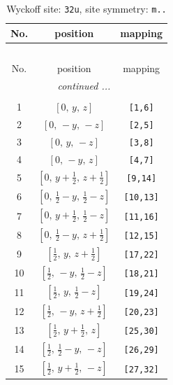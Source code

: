 \documentclass[fleqn,8pt]{jsarticle}
\begin{document}
\renewcommand{\arraystretch}{1.2}
\begin{longtable}{ccc}
\caption{Wyckoff site: {\tt 32u}, site symmetry: {\tt m..}}
 \\
 \hline \hline
No. & position & mapping \\ \hline \endfirsthead

\multicolumn{2}{l}{\tablename\ \thetable{}} \\
 \hline \hline
No. & position & mapping \\ \hline \endhead

 \hline \hline
\multicolumn{2}{r}{\footnotesize\it continued ...} \\ \endfoot

 \hline \hline
\multicolumn{2}{r}{} \\ \endlastfoot

1 & $\left[ 0,\, y,\, z \right]$ & {\tt [1,6]} \\ \hline
2 & $\left[ 0,\, - y,\, - z \right]$ & {\tt [2,5]} \\ \hline
3 & $\left[ 0,\, y,\, - z \right]$ & {\tt [3,8]} \\ \hline
4 & $\left[ 0,\, - y,\, z \right]$ & {\tt [4,7]} \\ \hline
5 & $\left[ 0,\, y + \frac{1}{2},\, z + \frac{1}{2} \right]$ & {\tt [9,14]} \\ \hline
6 & $\left[ 0,\, \frac{1}{2} - y,\, \frac{1}{2} - z \right]$ & {\tt [10,13]} \\ \hline
7 & $\left[ 0,\, y + \frac{1}{2},\, \frac{1}{2} - z \right]$ & {\tt [11,16]} \\ \hline
8 & $\left[ 0,\, \frac{1}{2} - y,\, z + \frac{1}{2} \right]$ & {\tt [12,15]} \\ \hline
9 & $\left[ \frac{1}{2},\, y,\, z + \frac{1}{2} \right]$ & {\tt [17,22]} \\ \hline
10 & $\left[ \frac{1}{2},\, - y,\, \frac{1}{2} - z \right]$ & {\tt [18,21]} \\ \hline
11 & $\left[ \frac{1}{2},\, y,\, \frac{1}{2} - z \right]$ & {\tt [19,24]} \\ \hline
12 & $\left[ \frac{1}{2},\, - y,\, z + \frac{1}{2} \right]$ & {\tt [20,23]} \\ \hline
13 & $\left[ \frac{1}{2},\, y + \frac{1}{2},\, z \right]$ & {\tt [25,30]} \\ \hline
14 & $\left[ \frac{1}{2},\, \frac{1}{2} - y,\, - z \right]$ & {\tt [26,29]} \\ \hline
15 & $\left[ \frac{1}{2},\, y + \frac{1}{2},\, - z \right]$ & {\tt [27,32]} \\ \hline

\end{longtable}
\end{document}
